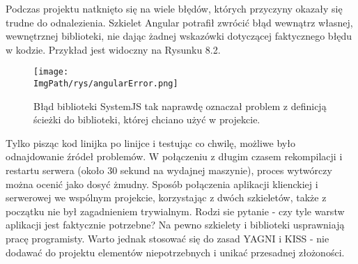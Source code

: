 \documentclass[a4paper,12pt,twoside,openany]{report}
\newcommand{\ImgPath}{.}
\begin{document}
Podczas projektu natknięto się na wiele błędów, których przyczyny okazały się trudne do odnalezienia. Szkielet Angular potrafił zwrócić błąd wewnątrz własnej, wewnętrznej biblioteki, nie dając żadnej wskazówki dotyczącej faktycznego błędu w kodzie. Przykład jest widoczny na Rysunku 8.2.
				\begin{sidewaysfigure}[!htbp]
					\begin{center}
						\centering
						\texttt{[image: \\ImgPath/rys/angularError.png]}
					\end{center}
					\caption{Błąd biblioteki SystemJS tak naprawdę oznaczał problem z definicją ścieżki do biblioteki, której chciano użyć w projekcie.}
					\label{UMLTS}
				\end{sidewaysfigure}
Tylko pisząc kod linijka po linijce i testując co chwilę, możliwe było odnajdowanie źródeł problemów. W połączeniu z długim czasem rekompilacji i restartu serwera (około 30 sekund na wydajnej maszynie), proces wytwórczy można ocenić jako dosyć żmudny. Sposób połączenia aplikacji klienckiej i serwerowej we wspólnym projekcie, korzystając z dwóch szkieletów, także z początku nie był zagadnieniem trywialnym. Rodzi sie pytanie - czy tyle warstw aplikacji jest faktycznie potrzebne? Na pewno szkielety i biblioteki usprawniają pracę programisty. Warto jednak stosować się do zasad YAGNI i KISS - nie dodawać do projektu elementów niepotrzebnych i unikać przesadnej złożoności.
\end{document}
